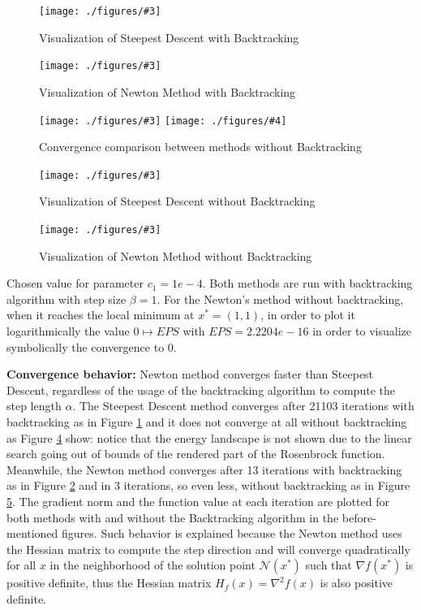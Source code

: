 \documentclass[unicode,11pt,a4paper,oneside,numbers=endperiod,openany]{scrartcl}
\newcommand{\myFigureEnergy}[3]{
    \begin{figure}[h]
    \centering
    \caption{#1}
    \label{#2}
    \texttt{[image: ./figures/\#3]}
    \end{figure}
}
\newcommand{\myFigureComparison}[4]{
    \begin{figure}[H]
    \centering
    \caption{#1}
    \label{#2}
    \texttt{[image: ./figures/\#3]}
    \texttt{[image: ./figures/\#4]}
    \end{figure}
}
\begin{document}
\myFigureEnergy
    {Visualization of Steepest Descent with Backtracking}
    {fig:ex1-sd-backtracking-energy}
    {ex1-sd-backtracking-energy.eps}

\myFigureEnergy
    {Visualization of Newton Method with Backtracking}
    {fig:ex1-newton-energy-backtracking}
    {ex1-newton-backtracking-energy.eps}

\myFigureComparison
    {Convergence comparison between methods without Backtracking}
    {fig:ex1-convergence-comparison}
    {ex1-sd-convergence.eps}
    {ex1-newton-convergence.eps}

\myFigureEnergy
    {Visualization of Steepest Descent without Backtracking}
    {fig:ex1-sd-energy}
    {ex1-sd-energy.eps}

\myFigureEnergy
    {Visualization of Newton Method without Backtracking}
    {fig:ex1-newton-energy}
    {ex1-newton-energy.eps}

Chosen value for parameter $c_1 = 1e-4$. 
Both methods are run with backtracking algorithm with step size $\beta = 1$.
For the Newton's method without backtracking, 
when it reaches the local minimum at $x^* = (1, 1)$,
in order to plot it logarithmically the value $0 \mapsto EPS$ with $EPS = 2.2204e-16$ 
in order to visualize symbolically the convergence to $0$.
\newline

\textbf{Convergence behavior:}
Newton method converges faster than Steepest Descent, 
regardless of the usage of the backtracking algorithm to compute the step length $\alpha$.
The Steepest Descent method converges after 21103 iterations with backtracking 
as in Figure \ref{fig:ex1-sd-backtracking-energy}
and it does not converge at all without backtracking as Figure \ref{fig:ex1-sd-energy} show:
notice that the energy landscape is not shown due to the linear search going out of bounds of the rendered 
part of the Rosenbrock function. 
Meanwhile, the Newton method converges after 13 iterations with backtracking 
as in Figure \ref{fig:ex1-newton-energy-backtracking} and in 3 iterations, 
so even less, without backtracking as in Figure \ref{fig:ex1-newton-energy}.
The gradient norm and the function value at each iteration are plotted for both methods 
with and without the Backtracking algorithm in the before-mentioned figures.
Such behavior is explained because the Newton method uses the Hessian matrix to compute the step direction
and will converge quadratically for all $x$ in the neighborhood of the solution point $\mathcal{N}(x^*)$ 
such that $\nabla f(x^*)$ is positive definite,
thus the Hessian matrix $H_f(x) = \nabla^2 f(x)$ is also positive definite.
\newline
\end{document}
